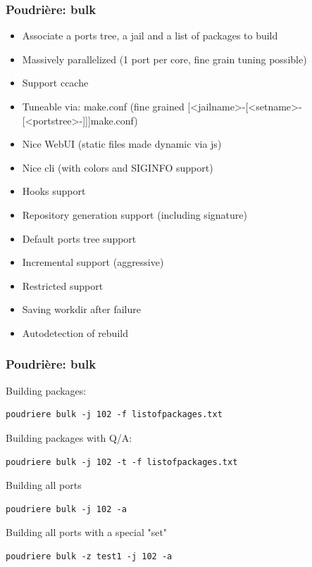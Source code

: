\begin{frame}
	\frametitle{Poudrière: bulk}
	\begin{itemize}
			\pause
		\item Associate a ports tree, a jail and a list of packages to build
			\pause
		\item Massively parallelized (1 port per core, fine grain tuning possible)
			\pause
		\item Support ccache
			\pause
		\item Tuneable via: make.conf (fine grained [<jailname>-[<setname>-[<portstree>-]]]make.conf)
			\pause
		\item Nice WebUI (static files made dynamic via js)
			\pause
		\item Nice cli (with colors and SIGINFO support)
			\pause
		\item Hooks support
			\pause
		\item Repository generation support (including signature)
			\pause
		\item Default ports tree support
			\pause
		\item Incremental support (aggressive)
			\pause
		\item Restricted support
			\pause
		\item Saving workdir after failure
			\pause
		\item Autodetection of rebuild
	\end{itemize}
\end{frame}

\begin{frame}[fragile]
	\frametitle{Poudrière: bulk}
	Building packages:
	\begin{lstlisting}
poudriere bulk -j 102 -f listofpackages.txt
\end{lstlisting}
	Building packages with Q/A:
	\begin{lstlisting}
poudriere bulk -j 102 -t -f listofpackages.txt
\end{lstlisting}
	Building all ports
	\begin{lstlisting}
poudriere bulk -j 102 -a
\end{lstlisting}
	Building all ports with a special "set"
	\begin{lstlisting}
poudriere bulk -z test1 -j 102 -a
\end{lstlisting}
\end{frame}

